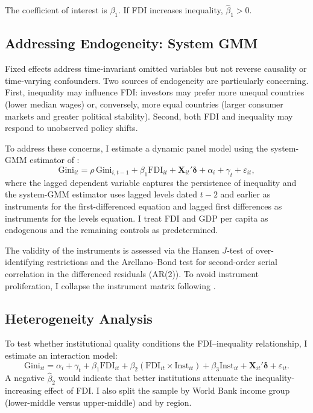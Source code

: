 \documentclass[12pt,a4paper]{article}
\begin{document}
The coefficient of interest is $\beta_1$.  If FDI increases inequality, $\hat{\beta}_1 > 0$.

\subsection{Addressing Endogeneity: System GMM}

Fixed effects address time-invariant omitted variables but not reverse causality or time-varying confounders.  Two sources of endogeneity are particularly concerning.  First, inequality may influence FDI: investors may prefer more unequal countries (lower median wages) or, conversely, more equal countries (larger consumer markets and greater political stability).  Second, both FDI and inequality may respond to unobserved policy shifts.

To address these concerns, I estimate a dynamic panel model using the system-GMM estimator of \citet{Blundell1998}:
\begin{equation}\label{eq:gmm}
  \text{Gini}_{it} = \rho\, \text{Gini}_{i,t-1} + \beta_1 \text{FDI}_{it} + \mathbf{X}_{it}'\boldsymbol{\delta} + \alpha_i + \gamma_t + \varepsilon_{it},
\end{equation}
where the lagged dependent variable captures the persistence of inequality and the system-GMM estimator uses lagged levels dated $t-2$ and earlier as instruments for the first-differenced equation and lagged first differences as instruments for the levels equation.  I treat FDI and GDP per capita as endogenous and the remaining controls as predetermined.

The validity of the instruments is assessed via the Hansen $J$-test of over-identifying restrictions and the Arellano--Bond test for second-order serial correlation in the differenced residuals (AR(2)).  To avoid instrument proliferation, I collapse the instrument matrix following \citet{Roodman2009}.

\subsection{Heterogeneity Analysis}

To test whether institutional quality conditions the FDI--inequality relationship, I estimate an interaction model:
\begin{equation}\label{eq:interact}
  \text{Gini}_{it} = \alpha_i + \gamma_t + \beta_1 \text{FDI}_{it} + \beta_2 (\text{FDI}_{it} \times \text{Inst}_{it}) + \beta_3 \text{Inst}_{it} + \mathbf{X}_{it}'\boldsymbol{\delta} + \varepsilon_{it}.
\end{equation}
A negative $\hat{\beta}_2$ would indicate that better institutions attenuate the inequality-increasing effect of FDI.  I also split the sample by World Bank income group (lower-middle versus upper-middle) and by region.
\end{document}
